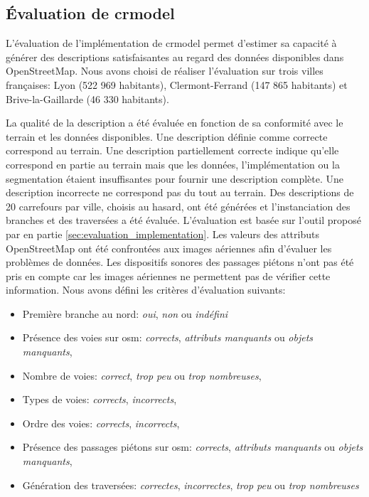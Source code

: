 \subsection{Évaluation de crmodel}

L'évaluation de l'implémentation de crmodel permet d'estimer sa capacité à générer des descriptions satisfaisantes au regard des données disponibles dans OpenStreetMap. Nous avons choisi de réaliser l'évaluation sur trois villes françaises: Lyon (522 969 habitants), Clermont-Ferrand (147 865 habitants) et Brive-la-Gaillarde (46 330 habitants).

\newpar{}

La qualité de la description a été évaluée en fonction de sa conformité avec le terrain et les données disponibles. Une description définie comme correcte correspond au terrain. Une description partiellement correcte indique qu'elle correspond en partie au terrain mais que les données, l'implémentation ou la segmentation étaient insuffisantes pour fournir une description complète. Une description incorrecte ne correspond pas du tout au terrain. Des descriptions de 20 carrefours par ville, choisis au hasard, ont été générées et l'instanciation des branches et des traversées a été évaluée. L'évaluation est basée sur l'outil proposé par en partie \ref{sec:evaluation_implementation}. Les valeurs des attributs OpenStreetMap ont été confrontées aux images aériennes afin d'évaluer les problèmes de données. Les dispositifs sonores des passages piétons n'ont pas été pris en compte car les images aériennes ne permettent pas de vérifier cette information. Nous avons défini les critères d’évaluation suivants:
\begin{itemize}
    \item Première branche au nord: \textit{oui}, \textit{non} ou \textit{indéfini}
    \item Présence des voies sur \gls{osm}: \textit{corrects}, \textit{attributs manquants} ou \textit{objets manquants},
    \item Nombre de voies: \textit{correct}, \textit{trop peu} ou \textit{trop nombreuses},
    \item Types de voies: \textit{corrects}, \textit{incorrects},
    \item Ordre des voies: \textit{corrects}, \textit{incorrects},
    \item Présence des passages piétons sur \gls{osm}: \textit{corrects}, \textit{attributs manquants} ou \textit{objets manquants},
    \item Génération des traversées: \textit{correctes}, \textit{incorrectes}, \textit{trop peu} ou \textit{trop nombreuses}
\end{itemize}

